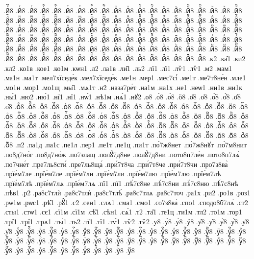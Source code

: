 {.йⷬ҇8
.йⷭ8
.йⷭ8
.йⷭ҇8
.йⷭ҇8
.йⷮ8
.йⷮ8
.йⷮ҇8
.йⷮ҇8
.йⷯ8
.йⷯ8
.йⷯ҇8
.йⷯ҇8
.йⷰ8
.йⷰ8
.йⷰ҇8
.йⷰ҇8
.йⷱ8
.йⷱ8
.йⷱ҇8
.йⷱ҇8
.йⷲ8
.йⷲ8
.йⷲ҇8
.йⷲ҇8
.йⷳ8
.йⷳ8
.йⷳ҇8
.йⷳ҇8
.йⷴ8
.йⷴ8
.йⷴ҇8
.йⷴ҇8
.йⷵ8
.йⷵ8
.йⷵ҇8
.йⷵ҇8
.йⷶ8
.йⷶ8
.йⷶ҇8
.йⷶ҇8
.йⷷ8
.йⷷ8
.йⷷ҇8
.йⷷ҇8
.йⷸ8
.йⷸ8
.йⷸ҇8
.йⷸ҇8
.йⷹ8
.йⷹ8
.йⷹ҇8
.йⷹ҇8
.йⷺ8
.йⷺ8
.йⷺ҇8
.йⷺ҇8
.йⷻ8
.йⷻ8
.йⷻ҇8
.йⷻ҇8
.йⷼ8
.йⷼ8
.йⷼ҇8
.йⷼ҇8
.йⷽ8
.йⷽ8
.йⷽ҇8
.йⷽ҇8
.йⷾ8
.йⷾ8
.йⷾ҇8
.йⷾ҇8
.йⷿ8
.йⷿ8
.йⷿ҇8
.йⷿ҇8
.йꙴ8
.йꙴ8
.йꙴ҇8
.йꙴ҇8
.йꙵ8
.йꙵ8
.йꙵ҇8
.йꙵ҇8
.йꙶ8
.йꙶ8
.йꙶ҇8
.йꙶ҇8
.йꙷ8
.йꙷ8
.йꙷ҇8
.йꙷ҇8
.йꙸ8
.йꙸ8
.йꙸ҇8
.йꙸ҇8
.йꙹ8
.йꙹ8
.йꙹ҇8
.йꙹ҇8
.йꙺ8
.йꙺ8
.йꙺ҇8
.йꙺ҇8
.йꙻ8
.йꙻ8
.йꙻ҇8
.йꙻ҇8
.й꙼8
.й꙼8
.й꙼҇8
.й꙼҇8
.й꙽8
.й꙽8
.й꙽҇8
.й꙽҇8
.к2
.ка̑1
.ки2
.кл2
.ко1в
.кое1
.ко1м
.кѡн1
.л2
.ла1в
.ли̑1
.ль2
.лї1
.лї1
.лѷ1
.лѷ1
.м2
.мам1
.ма1н
.ма1т
.мел7хїседе́к
.мел7хїседе́к
.ме1н
.мер1
.мес7сі́
.ме1т
.ме7т8не́н
.мле1
.мо1н
.мор1
.мо1щ
.мы̑1
.мѧ1т
.н2
.наза7ре́т
.на1м
.на1х
.не1
.неѡ1
.ни1в
.ни1к
.ны́1
.ню2
.ню́1
.нї1
.нї1
.нѡ́1
.нѣ1м
.нѧ́1
.нꙋ2
.о8
.о̀8
.о́8
.ӧ8
.о̑8
.о҆8
.о҆̀8
.о҆́8
.о҆̈8
.о҆̑8
.оⷠ8
.оⷠ҇8
.оⷡ8
.оⷡ҇8
.оⷢ8
.оⷢ҇8
.оⷣ8
.оⷣ҇8
.оⷤ8
.оⷤ҇8
.оⷥ8
.оⷥ҇8
.оⷦ8
.оⷦ҇8
.оⷧ8
.оⷧ҇8
.оⷨ8
.оⷨ҇8
.оⷩ8
.оⷩ҇8
.оⷪ8
.оⷪ҇8
.оⷫ8
.оⷫ҇8
.оⷬ8
.оⷬ҇8
.оⷭ8
.оⷭ҇8
.оⷮ8
.оⷮ҇8
.оⷯ8
.оⷯ҇8
.оⷰ8
.оⷰ҇8
.оⷱ8
.оⷱ҇8
.оⷲ8
.оⷲ҇8
.оⷳ8
.оⷳ҇8
.оⷴ8
.оⷴ҇8
.оⷵ8
.оⷵ҇8
.оⷶ8
.оⷶ҇8
.оⷷ8
.оⷷ҇8
.оⷸ8
.оⷸ҇8
.оⷹ8
.оⷹ҇8
.оⷺ8
.оⷺ҇8
.оⷻ8
.оⷻ҇8
.оⷼ8
.оⷼ҇8
.оⷽ8
.оⷽ҇8
.оⷾ8
.оⷾ҇8
.оⷿ8
.оⷿ҇8
.оꙴ8
.оꙴ҇8
.оꙵ8
.оꙵ҇8
.оꙶ8
.оꙶ҇8
.оꙷ8
.оꙷ҇8
.оꙸ8
.оꙸ҇8
.оꙹ8
.оꙹ҇8
.оꙺ8
.оꙺ҇8
.оꙻ8
.оꙻ҇8
.о꙼8
.о꙼҇8
.о꙽8
.о꙽҇8
.п2
.па1д
.па1с
.пе1л
.пер1
.пе1т
.пе1ц
.пи1т
.по́7ж8нет
.по́7ж8нꙋт
.по́7м8нит
.по8д7но́г
.по8д7но́ж
.по7злащ
.полꙋ́7д8не
.полꙋ́7д8ни
.пото8п7ле́н
.пото8п7лѧ́
.по7чне́т
.пре7ль8сти́
.пре7ль8ща́
.при́7т8ча
.при́7т8че
.при́7т8чи
.про7з8ва̀
.прїе́м7ле
.прїе́м7ле
.прїе́м7ли
.прїе́м7ли
.прїе́м7лю
.прїе́м7лю
.прїе́м7лѣ
.прїе́м7лѣ
.прїе́м7лѧ
.прїе́м7лѧ
.пї1
.пї1
.пѣ́7с8не
.пѣ́7с8ни
.пѣ́7с8ню
.пѣ́7с8нѣ
.пѣв1
.р2
.ра8с7тлѝ
.ра8с7тлѝ
.ра8с7тлѣ́
.ра8с7тлѧ
.ра8с7точ
.ра1х
.ри2
.ро1в
.роз1
.рѡ1м
.рѡс1
.рѣ̑1
.рꙋ̑1
.с2
.сен1
.слѧ1
.сма1
.смо1
.со7з8ва́
.спо1
.сподо8б7лѧ́
.ст2
.сты1
.стѡ1
.сє1
.сї1м
.сї1м
.сѣ̑1
.сѣн1
.сѧ́1
.т2
.та̑1
.те1ц
.ти1м
.тл2
.то1м
.тор1
.трї1
.трї1
.трѧ1
.ты́1
.ть2
.тї1
.тї1
.тѵ́1
.тѷ2
.тѷ2
.у8
.у̀8
.у́8
.ӱ8
.у̑8
.у҆8
.у҆̀8
.у҆́8
.у҆̈8
.у҆̑8
.уⷠ8
.уⷠ҇8
.уⷡ8
.уⷡ҇8
.уⷢ8
.уⷢ҇8
.уⷣ8
.уⷣ҇8
.уⷤ8
.уⷤ҇8
.уⷥ8
.уⷥ҇8
.уⷦ8
.уⷦ҇8
.уⷧ8
.уⷧ҇8
.уⷨ8
.уⷨ҇8
.уⷩ8
.уⷩ҇8
.уⷪ8
.уⷪ҇8
.уⷫ8
.уⷫ҇8
.уⷬ8
.уⷬ҇8
.уⷭ8
.уⷭ҇8
.уⷮ8
.уⷮ҇8
.уⷯ8
.уⷯ҇8
.уⷰ8
.уⷰ҇8
.уⷱ8
.уⷱ҇8
.уⷲ8
.уⷲ҇8
.уⷳ8
.уⷳ҇8
.уⷴ8
.уⷴ҇8
.уⷵ8
.уⷵ҇8
.уⷶ8
.уⷶ҇8
.уⷷ8
.уⷷ҇8
.уⷸ8
.уⷸ҇8
.уⷹ8
.уⷹ҇8
.уⷺ8
.уⷺ҇8
.уⷻ8
}

